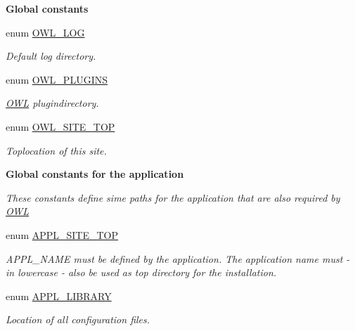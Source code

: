 \begin{Indent}{\bf Global constants}
\begin{DoxyCompactItemize}
enum \hyperlink{OWLloader_8php_ae3fe8a897196b3cb98b8827a9a940ccb}{OWL\_\-LOG} 
\begin{DoxyCompactList}\small\item\em Default log directory. \item\end{DoxyCompactList}\item 
enum \hyperlink{OWLloader_8php_acb1e6e914bd3c0c96fc20ae6bb3a8a99}{OWL\_\-PLUGINS} 
\begin{DoxyCompactList}\small\item\em \hyperlink{classOWL}{OWL} plugindirectory. \item\end{DoxyCompactList}\item 
enum \hyperlink{OWLloader_8php_a462de9ae02e394313337afac5d1a5f95}{OWL\_\-SITE\_\-TOP} 
\begin{DoxyCompactList}\small\item\em Toplocation of this site. \item\end{DoxyCompactList}\end{DoxyCompactItemize}
\end{Indent}
\begin{Indent}{\bf Global constants for the application}\par
{\em \label{_amgrp3ebb069601fef11bcb0ba759cb17b4d6}
 These constants define sime paths for the application that are also required by \hyperlink{classOWL}{OWL} }\begin{DoxyCompactItemize}
\item 
enum \hyperlink{OWLloader_8php_a17a0c6fb6eda7d05081d16bc519c97b5}{APPL\_\-SITE\_\-TOP} 
\begin{DoxyCompactList}\small\item\em APPL\_\-NAME must be defined by the application. The application name must -\/ in lowercase -\/ also be used as top directory for the installation. \item\end{DoxyCompactList}\item 
enum \hyperlink{OWLloader_8php_a1b19bb6ffba1d1e7871092e086cc4e94}{APPL\_\-LIBRARY} 
\begin{DoxyCompactList}\small\item\em Location of all configuration files. \item\end{DoxyCompactList}\end{DoxyCompactItemize}
\end{Indent}
